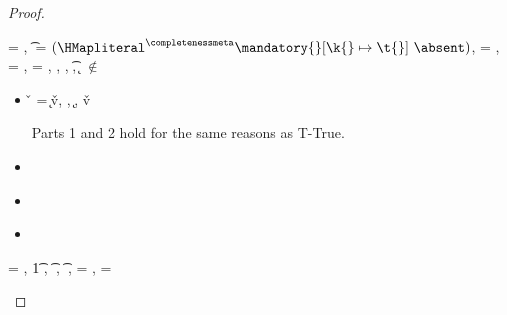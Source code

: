 \begin{lemma}
\begin{proof}
\begin{case}[T-AssocHMap]
  \e{} = { {} {}},
  \t{} = ${\HMapgeneric {\extendmandatoryset {\mandatory{}}{\k{}}{\t{}}} {\absent}}$,
  \thenprop{\prop{}} = {\topprop{}},
  \elseprop{\prop{}} = {\botprop{}},
  \object{} = \emptyobject,
  \judgementtwo {\propenv{}} {} {\HMapgeneric {\mandatory{}} {\absent}},
  \judgementtwo {\propenv{}} {} {\Value{\k{}}},
  \judgementtwo {\propenv{}} {} {\t{}},
  {\k{}} $\not\in$ {\absent{}}

  \begin{itemize}
    \item[]
      \begin{subcase}[B-Assoc]
        \v{} = 
        {
                {\k{}}{\v{v}}},
        \opsem {\openv{}}
        {} {},
        \opsem {\openv{}} {} {\k{}},
        \opsem {\openv{}} {} {\v{v}}

        Parts 1 and 2 hold for the same reasons as T-True.
      \end{subcase}
    \item[]
      \begin{subcase}[BE-Assoc1]
      \end{subcase}
    \item[]
      \begin{subcase}[BE-Assoc2]
      \end{subcase}
    \item[]
      \begin{subcase}[BE-Assoc3]
      \end{subcase}
  \end{itemize}
\end{case}

\begin{case}[T-If] \e{} = { {} {}},
  \judgement {\propenv{}} {} {\t{1}} { {}}
                 {},
                 {} {\t{}} { {}}
                 {\object{}},
                 {} {\t{}} { {}}
                 {\object{}},
  \thenprop{\prop{}} = { {}},
  \elseprop{\prop{}} = { {}}


\end{case}
\end{proof}
\end{lemma}
